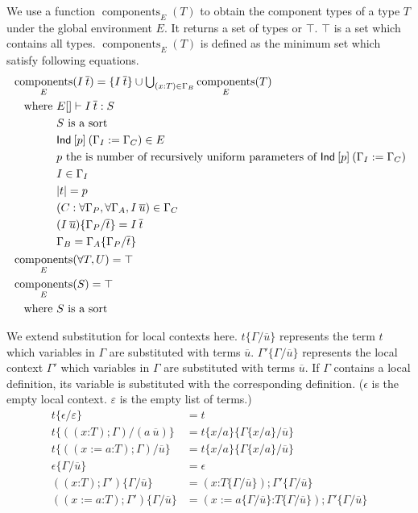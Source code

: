 \documentclass[a4paper,fleqn]{article}
\newcommand{\lassum}[2]{(#1\mathord{:}#2)}
\newcommand{\ldef}[3]{(#1:=#2\mathord{:}#3)}
\newcommand{\tbigcup}{{\textstyle\bigcup}}
\DeclareMathOperator{\components}{components}
\newcommand{\subst}[3]{#1\{#2/#3\}}
\newcommand{\rep}[1]{\overline{#1}}
\begin{document}
We use a function $\components_E(T)$ to obtain the component types of a type $T$ under the global environment $E$.
It returns a set of types or $\top$.
$\top$ is a set which contains all types.
$\components_E(T)$ is defined as the minimum set which satisfy following equations.
\begin{align*}
  & \components_E(I\:\rep{t}) = \{I\:\rep{t}\} \cup \tbigcup_{(x{}:T) \in \Gamma_B} \components_E(T) \\
  & \begin{aligned}
    \quad \text{where}~
    & E[] \vdash I\:\rep{t} : S \\
    & \text{$S$ is a sort} \\
    & \text{\sf Ind}\:[p]\:(\Gamma_I := \Gamma_C) \in E \\
    & \text{$p$ the is number of recursively uniform parameters of $\text{\sf Ind}\:[p]\:(\Gamma_I := \Gamma_C)$} \\
    & I \in \Gamma_I \\
    & |t| = p \\
    & (C:\forall \Gamma_P, \forall \Gamma_A, I\:\rep{u}) \in \Gamma_C \\
    & \subst{(I\:\rep{u})}{\Gamma_P}{\rep{t}} = I\:\rep{t} \\
    & \Gamma_B = \subst{\Gamma_A}{\Gamma_P}{\rep{t}}
    \end{aligned} \\
  & \components_E(\forall T, U) = \top \\
  & \components_E(S) = \top \\
  & \quad \text{where}~ \text{$S$ is a sort} \\
\end{align*}

We extend substitution for local contexts here.
$\subst{t}{\Gamma}{\rep{u}}$ represents the term $t$ which variables in $\Gamma$ are substituted with terms $\rep{u}$.
$\subst{\Gamma'}{\Gamma}{\rep{u}}$ represents the local context $\Gamma'$ which variables in $\Gamma$ are substituted with terms $\rep{u}$.
If $\Gamma$ contains a local definition, its variable is substituted with the corresponding definition.
($\epsilon$ is the empty local context. $\varepsilon$ is the empty list of terms.)
\begin{align*}
  \subst{t}{\epsilon}{\varepsilon} &= t \\
  \subst{t}{(\lassum{x}{T};\Gamma)}{(a\:\rep{u})} &= \subst{\subst{t}{x}{a}}{\subst{\Gamma}{x}{a}}{\rep{u}} \\
  \subst{t}{(\ldef{x}{a}{T};\Gamma)}{\rep{u}} &= \subst{\subst{t}{x}{a}}{\subst{\Gamma}{x}{a}}{\rep{u}} \\
  \subst{\epsilon}{\Gamma}{\rep{u}} &= \epsilon \\
  \subst{(\lassum{x}{T};\Gamma')}{\Gamma}{\rep{u}} &= \lassum{x}{\subst{T}{\Gamma}{\rep{u}}};\subst{\Gamma'}{\Gamma}{\rep{u}} \\
  \subst{(\ldef{x}{a}{T};\Gamma')}{\Gamma}{\rep{u}} &= \ldef{x}{\subst{a}{\Gamma}{\rep{u}}}{\subst{T}{\Gamma}{\rep{u}}};\subst{\Gamma'}{\Gamma}{\rep{u}}
\end{align*}
\end{document}
